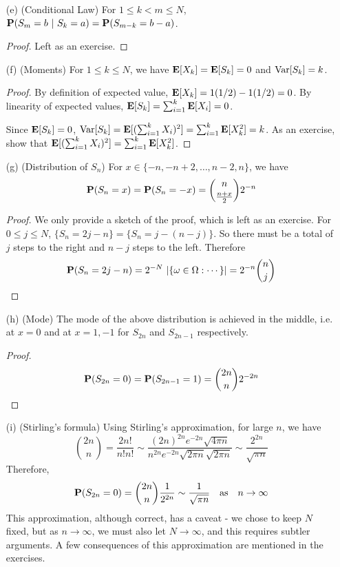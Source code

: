 \documentclass[main]{subfiles}
\begin{document}
\begin{obs}
\begin{enumerate}
            \begin{proof}
                Left as an exercise.
            \end{proof}

            \item[(e)](Conditional Law) For $ 1\le k<m\le N $, $ \P(S_m=b\ |\ S_k=a)=\P(S_{m-k}=b-a) $.

            \begin{proof}
                Left as an exercise.
            \end{proof}

            \item[(f)](Moments) For $ 1\le k\le N $, we have $ \E[X_k]=\E[S_k]=0 $ and $ \Var[S_k]=k $.

            \begin{proof}
                By definition of expected value, $ \E[X_k]= 1(1/2) -1(1/2) =0 $. By linearity of expected values, $ \E[S_k]=\sum_{i=1}^k\E[X_i]=0 $.

                Since $ \E[S_k]=0 $, $ \Var[S_k]=\E[(\sum_{i=1}^kX_i)^2]=\sum_{i=1}^k\E[X_k^2]=k$. As an exercise, show that $ \E[(\sum_{i=1}^kX_i)^2]=\sum_{i=1}^k\E[X_k^2] $.
            \end{proof}

            \item[(g)](Distribution of $ S_n $) For $ x\in\{-n, -n+2, \ldots, n-2, n\} $, we have \[\P(S_n=x)=\P(S_n=-x)=\binom{n}{\frac{n+x}{2}}2^{-n}\]

            \begin{proof}
                We only provide a sketch of the proof, which is left as an exercise. For $ 0\le j\le N $, $ \{S_n=2j-n\}=\{S_n=j-(n-j)\} $. So there must be a total of $ j $ steps to the right and $ n-j $ steps to the left. Therefore \[\P(S_n=2j-n)=2^{-N}\ |\{\omega\in\Omega:\cdots\}|=2^{-n}\binom{n}{j}\]
            \end{proof}

            \item[(h)](Mode) The mode of the above distribution is achieved in the middle, i.e. at $ x=0 $ and at $ x=1,-1 $ for $ S_{2n} $ and $ S_{2n-1} $ respectively.

            \begin{proof}
                \[\P(S_{2n}=0)=\P(S_{2n-1}=1)=\binom{2n}{n}2^{-2n}\]
            \end{proof}

            \item[(i)](Stirling's formula) Using Stirling's approximation, for large $ n $, we have
            \[\binom{2n}{n}=\frac{2n!}{n!n!}\sim\frac{(2n)^{2n}e^{-2n}\sqrt{4\pi n}}{n^{2n}e^{-2n}\sqrt{2\pi n}\sqrt{2\pi n}}\sim\frac{2^{2n}}{\sqrt{\pi n}}\tag{$ \ast $}\]
            Therefore,
            \[\P(S_{2n}=0)=\binom{2n}{n}\frac{1}{2^{2n}}\sim\frac{1}{\sqrt{\pi n}}\text{\quad as\quad $ n\to\infty $}\]
            This approximation, although correct, has a caveat - we chose to keep $ N $ fixed, but as $ n\to\infty $, we must also let $ N\to\infty $, and this requires subtler arguments. A few consequences of this approximation are mentioned in the exercises.\\


\end{enumerate}
\end{obs}
\end{document}
